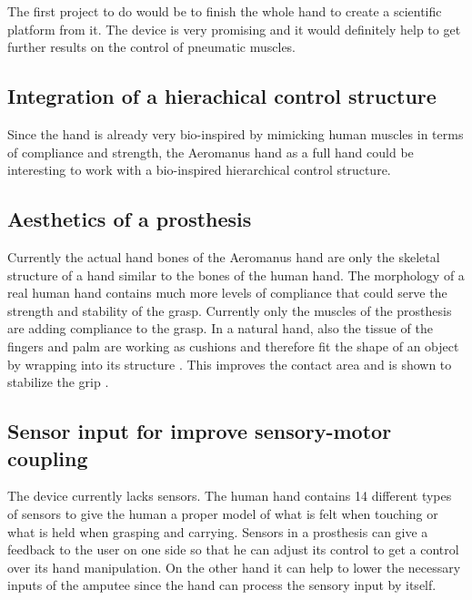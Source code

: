 \documentclass[main]{subfiles}
\begin{document}
The first project to do would be to finish the whole hand to create a scientific platform from it. The device is very promising and it would definitely help to get further results on the control of pneumatic muscles. 

\subsection{Integration of a hierachical control structure}

Since the hand is already very bio-inspired by mimicking human muscles in terms of compliance and strength, the Aeromanus hand as a full hand could be interesting to work with a bio-inspired hierarchical control structure. 


\subsection{Aesthetics of a prosthesis}

Currently the actual hand bones of the Aeromanus hand are only the skeletal structure of a hand similar to the bones of the human hand. The morphology of a real human hand contains much more levels of compliance that could serve the strength and stability of the grasp. Currently only the muscles of the prosthesis are adding compliance to the grasp. In a natural hand, also the tissue of the fingers and palm are working as cushions and therefore fit the shape of an object by wrapping into its structure \cite{Kargov2004}. This improves the contact area and is shown to stabilize the grip \cite{Kargov2004}.


\subsection{Sensor input for improve sensory-motor coupling}

The device currently lacks sensors. The human hand contains 14 different types of sensors to give the human a proper model of what is felt when touching or what is held when grasping and carrying. Sensors in a prosthesis can give a feedback to the user on one side so that he can adjust its control to get a control over its hand manipulation. On the other hand it can help to lower the necessary inputs of the amputee since the hand can process the sensory input by itself.

\end{document}
